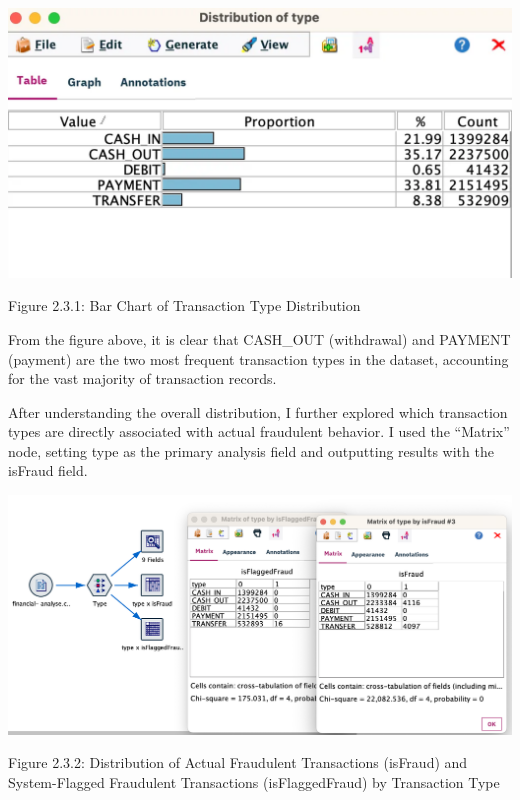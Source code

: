 \documentclass[sigplan,screen]{acmart}
\begin{document}
\vspace{0.3cm}

\begin{center}
\includegraphics[width=0.9\columnwidth]{2.3.1.png}
\vspace{0.2cm}

Figure 2.3.1: Bar Chart of Transaction Type Distribution
\end{center}

\vspace{0.3cm}

From the figure above, it is clear that CASH\_OUT (withdrawal) and PAYMENT (payment) are the two most frequent transaction types in the dataset, accounting for the vast majority of transaction records.

After understanding the overall distribution, I further explored which transaction types are directly associated with actual fraudulent behavior. I used the ``Matrix'' node, setting type as the primary analysis field and outputting results with the isFraud field.

\vspace{0.3cm}

\begin{center}
\includegraphics[width=0.9\columnwidth]{2.3.2.png}
\vspace{0.2cm}

Figure 2.3.2: Distribution of Actual Fraudulent Transactions (isFraud) and System-Flagged Fraudulent Transactions (isFlaggedFraud) by Transaction Type
\end{center}
\end{document}
